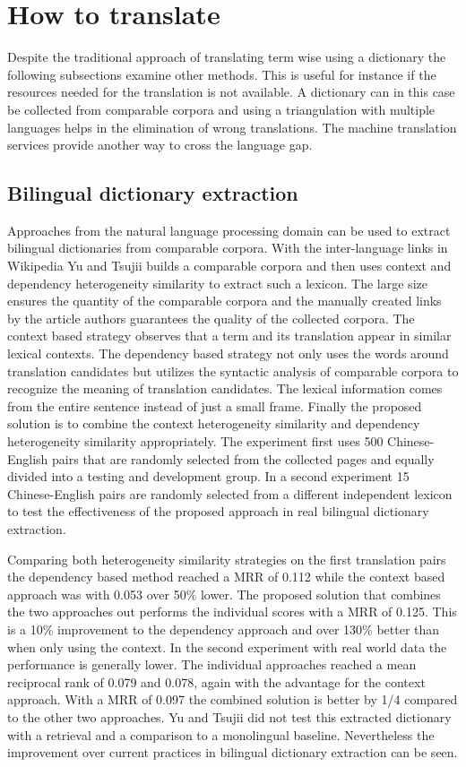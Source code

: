 \documentclass[journal]{IEEEtran}
\begin{document}
\section*{How to translate}
Despite the traditional approach of translating term wise using a dictionary the following subsections examine other methods.
This is useful for instance if the resources needed for the translation is not available.
A dictionary can in this case be collected from comparable corpora and using a triangulation with multiple languages helps in the elimination of wrong translations.
The machine translation services provide another way to cross the language gap.

\setcounter{subsection}{0}

\subsection{Bilingual dictionary extraction}
Approaches from the natural language processing domain can be used to extract bilingual dictionaries from comparable corpora.
With the inter-language links in Wikipedia Yu and Tsujii \cite{yu09} builds a comparable corpora and then uses context and dependency heterogeneity similarity to extract such a lexicon.
The large size ensures the quantity of the comparable corpora and the manually created links by the article authors guarantees the quality of the collected corpora.
The context based strategy observes that a term and its translation appear in similar lexical contexts.
The dependency based strategy not only uses the words around translation candidates but utilizes the syntactic analysis of comparable corpora to recognize the meaning of translation candidates.
The lexical information comes from the entire sentence instead of just a small frame.
Finally the proposed solution is to combine the context heterogeneity similarity and dependency heterogeneity similarity appropriately.
The experiment first uses 500 Chinese-English pairs that are randomly selected from the collected pages and equally divided into a testing and development group.
In a second experiment 15 Chinese-English pairs are randomly selected from a different independent lexicon to test the effectiveness of the proposed approach in real bilingual dictionary extraction.

Comparing both heterogeneity similarity strategies on the first translation pairs the dependency based method reached a MRR of 0.112 while the context based approach was with 0.053 over 50\% lower.
The proposed solution that combines the two approaches out performs the individual scores with a MRR of 0.125.
This is a 10\% improvement to the dependency approach and over 130\% better than when only using the context.
In the second experiment with real world data the performance is generally lower.
The individual approaches reached a mean reciprocal rank of 0.079 and 0.078, again with the advantage for the context approach.
With a MRR of 0.097 the combined solution is better by 1/4 compared to the other two approaches.
Yu and Tsujii did not test this extracted dictionary with a retrieval and a comparison to a monolingual baseline.
Nevertheless the improvement over current practices in bilingual dictionary extraction can be seen.
\end{document}
